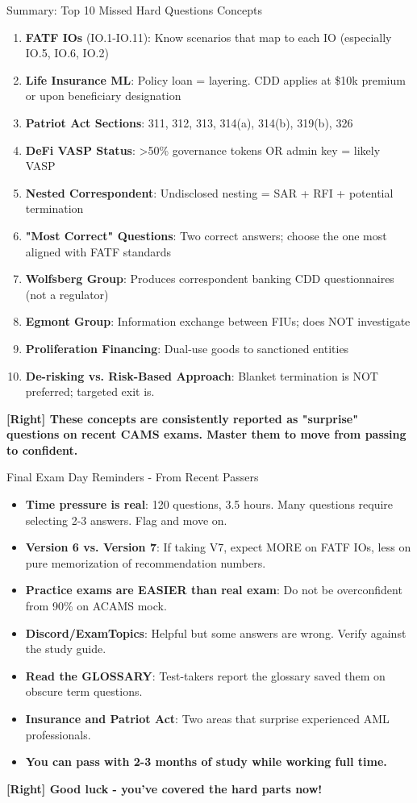 \documentclass[11pt,a4paper]{beamer}
\newcommand{\greennote}[1]{\textcolor{green!50!black}{\textbf{[Right] #1}}}
\begin{document}
\begin{frame}{Summary: Top 10 Missed Hard Questions Concepts}
\begin{enumerate}
\item \textbf{FATF IOs} (IO.1-IO.11): Know scenarios that map to each IO (especially IO.5, IO.6, IO.2)
\item \textbf{Life Insurance ML}: Policy loan = layering. CDD applies at \$10k premium or upon beneficiary designation
\item \textbf{Patriot Act Sections}: 311, 312, 313, 314(a), 314(b), 319(b), 326
\item \textbf{DeFi VASP Status}: >50\% governance tokens OR admin key = likely VASP
\item \textbf{Nested Correspondent}: Undisclosed nesting = SAR + RFI + potential termination
\item \textbf{"Most Correct" Questions}: Two correct answers; choose the one most aligned with FATF standards
\item \textbf{Wolfsberg Group}: Produces correspondent banking CDD questionnaires (not a regulator)
\item \textbf{Egmont Group}: Information exchange between FIUs; does NOT investigate
\item \textbf{Proliferation Financing}: Dual-use goods to sanctioned entities
\item \textbf{De-risking vs. Risk-Based Approach}: Blanket termination is NOT preferred; targeted exit is.
\end{enumerate}
\greennote{These concepts are consistently reported as "surprise" questions on recent CAMS exams. Master them to move from passing to confident.}
\end{frame}

\begin{frame}{Final Exam Day Reminders - From Recent Passers}
\begin{itemize}
\item \textbf{Time pressure is real}: 120 questions, 3.5 hours. Many questions require selecting 2-3 answers. Flag and move on.
\item \textbf{Version 6 vs. Version 7}: If taking V7, expect MORE on FATF IOs, less on pure memorization of recommendation numbers.
\item \textbf{Practice exams are EASIER than real exam}: Do not be overconfident from 90\% on ACAMS mock.
\item \textbf{Discord/ExamTopics}: Helpful but some answers are wrong. Verify against the study guide.
\item \textbf{Read the GLOSSARY}: Test-takers report the glossary saved them on obscure term questions.
\item \textbf{Insurance and Patriot Act}: Two areas that surprise experienced AML professionals.
\item \textbf{You can pass with 2-3 months of study while working full time.}
\end{itemize}
\vspace{0.5cm}
\centering
\greennote{Good luck - you've covered the hard parts now!}
\end{frame}
\end{document}
